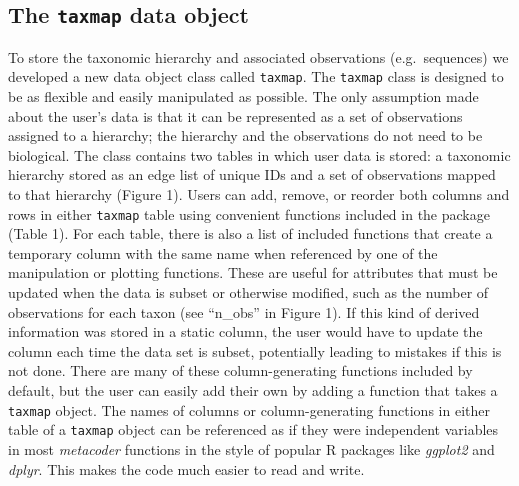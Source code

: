 \documentclass[10pt,letterpaper]{article}
\begin{document}
\subsection*{\texorpdfstring{The \texttt{taxmap} data
object}{The taxmap data object}}\label{the-taxmap-data-object}

To store the taxonomic hierarchy and associated observations
(e.g.~sequences) we developed a new data object class called
\texttt{taxmap}. The \texttt{taxmap} class is designed to be as flexible
and easily manipulated as possible. The only assumption made about the
user's data is that it can be represented as a set of observations
assigned to a hierarchy; the hierarchy and the observations do not need
to be biological. The class contains two tables in which user data is
stored: a taxonomic hierarchy stored as an edge list of unique IDs and a
set of observations mapped to that hierarchy (Figure 1). Users can add,
remove, or reorder both columns and rows in either \texttt{taxmap} table
using convenient functions included in the package (Table 1). For each
table, there is also a list of included functions that create a
temporary column with the same name when referenced by one of the
manipulation or plotting functions. These are useful for attributes that
must be updated when the data is subset or otherwise modified, such as
the number of observations for each taxon (see ``n\_obs'' in Figure 1).
If this kind of derived information was stored in a static column, the
user would have to update the column each time the data set is subset,
potentially leading to mistakes if this is not done. There are many of
these column-generating functions included by default, but the user can
easily add their own by adding a function that takes a \texttt{taxmap}
object. The names of columns or column-generating functions in either
table of a \texttt{taxmap} object can be referenced as if they were
independent variables in most \emph{metacoder} functions in the style of
popular R packages like \emph{ggplot2} and \emph{dplyr}. This makes the
code much easier to read and write.
\end{document}
